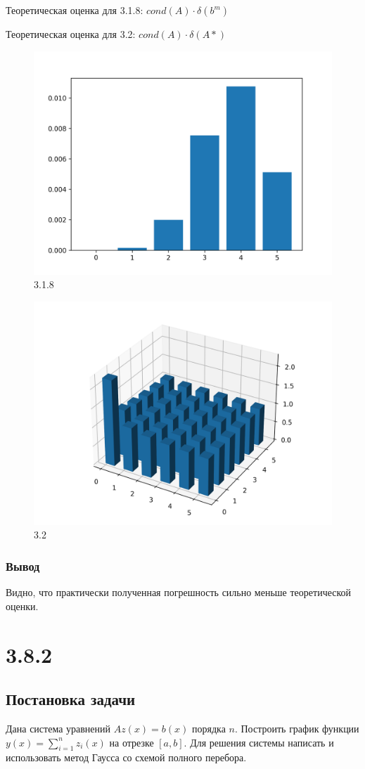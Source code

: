 \documentclass[a4paper,11pt]{article}
\theoremstyle{definition} %
\theoremstyle{remark} %
\begin{document}
Теоретическая оценка для 3.1.8: $cond(A) \cdot \delta (b^m)$

Теоретическая оценка для 3.2: $cond(A) \cdot \delta (A*)$

\newpage
\begin{figure}[h]
    \center\includegraphics[width=0.49\linewidth]{../../3.1.8-3.2/3.1.8.png}
    \caption{3.1.8}
\end{figure}
\begin{figure}[h]
    \center\includegraphics[width=0.49\linewidth]{../../3.1.8-3.2/3.2.png}
    \caption{3.2}
\end{figure}

\subsubsection{Вывод}

Видно, что практически полученная погрешность сильно меньше теоретической оценки.

\newpage

\section{3.8.2}

\subsection{Постановка задачи}

Дана система уравнений $A z(x)=b(x)$ порядка $n$. Построить график функции $y(x) = \sum\limits_{i=1}^{n} z_i (x)$ на отрезке $[a, b]$.
Для решения системы написать и использовать метод Гаусса со схемой полного перебора.
\end{document}
